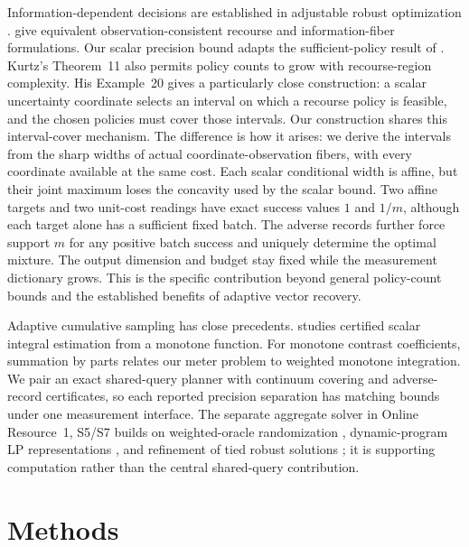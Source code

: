 \documentclass[12pt]{article}
\begin{document}
Information-dependent decisions are established in adjustable robust
optimization \citep{wei2024}. \citet[Section~3.2, Eq.~(3) and
Theorem~3.2, author manuscript v3]{ddid} give equivalent
observation-consistent recourse and information-fiber formulations.
Our scalar precision bound adapts the
sufficient-policy result of \citet[Theorem~2 and Example~5]{kurtz2026}.
Kurtz's Theorem~11 also permits policy counts to grow with recourse-region
complexity. His Example~20 gives a particularly close construction: a
scalar uncertainty coordinate selects an interval on which a recourse
policy is feasible, and the chosen policies must cover those intervals.
Our construction shares this interval-cover mechanism. The difference is
how it arises: we derive the intervals from the sharp widths of actual
coordinate-observation fibers, with every coordinate available at the same
cost. Each scalar conditional width is affine, but their joint maximum
loses the concavity used by the scalar bound. Two
affine targets and two unit-cost readings have exact success values $1$
and $1/m$, although each target alone has a sufficient fixed batch.
The adverse records further force support $m$ for any positive batch
success and uniquely determine the optimal mixture. The output dimension
and budget stay fixed while the measurement dictionary grows. This is the
specific contribution beyond general policy-count bounds and the established
benefits of adaptive vector recovery.

Adaptive cumulative sampling has close precedents.
\citet[Section~4.1.1, Corollary~1 and Theorem~3]{gaillard2023} studies
certified scalar integral estimation from a monotone function. For monotone
contrast coefficients, summation by parts relates our meter problem to
weighted monotone integration. We pair an exact shared-query planner with
continuum covering and adverse-record certificates, so each reported
precision separation has matching bounds under one measurement interface.
The separate aggregate solver in Online Resource~1, S5/S7 builds on
weighted-oracle randomization \citep{kawase2024}, dynamic-program LP
representations \citep{martin1990}, and refinement of tied robust solutions
\citep{iancu2014}; it is supporting computation rather than the central
shared-query contribution.

\section{Methods}\label{sec:methods}
\end{document}
